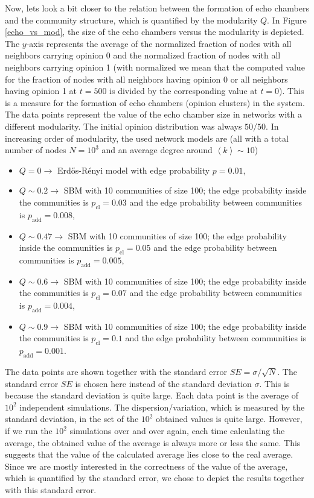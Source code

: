\documentclass[11 pt , letterpaper , twoside , openright]{book}
\begin{document}
Now, lets look a bit closer to the relation between the formation of echo chambers and the community structure, which is quantified by the modularity $Q$. In Figure \ref{echo_vs_mod}, the size of the echo chambers versus the modularity is depicted. The $y$-axis represents the average of the normalized fraction of nodes with all neighbors carrying opinion 0 and the normalized fraction of nodes with all neighbors carrying opinion 1 (with normalized we mean that the computed value for the fraction of nodes with all neighbors having opinion 0 or all neighbors having opinion 1 at $t=500$ is divided by the corresponding value at $t=0$). This is a measure for the formation of echo chambers (opinion clusters) in the system. The data points represent the value of the echo chamber size in networks with a different modularity. The initial opinion distribution was always $50/50$. 
\newpage
\noindent
In increasing order of modularity, the used network models are (all with a total number of nodes $N = 10^3$ and an average degree around $\left<k\right> \sim 10$)
\begin{itemize}
	\item $Q=0 \rightarrow$ Erd\H{o}s-R\'{e}nyi model with edge probability $p=0.01$,
	\item $Q \sim 0.2 \rightarrow$ SBM with 10 communities of size 100; the edge probability inside the communities is $p_{\text{cl}} = 0.03$ and the edge probability between communities is $p_{\text{add}} = 0.008$,
	\item $Q \sim 0.47 \rightarrow$ SBM with 10 communities of size 100; the edge probability inside the communities is $p_{\text{cl}} = 0.05$ and the edge probability between communities is $p_{\text{add}} = 0.005$,
	\item $Q \sim 0.6 \rightarrow$ SBM with 10 communities of size 100; the edge probability inside the communities is $p_{\text{cl}} = 0.07$ and the edge probability between communities is $p_{\text{add}} = 0.004$,
	\item $Q \sim 0.9 \rightarrow$ SBM with 10 communities of size 100; the edge probability inside the communities is $p_{\text{cl}} = 0.1$ and the edge probability between communities is $p_{\text{add}} = 0.001$.
\end{itemize}
The data points are shown together with the standard error $SE = \sigma /\sqrt{N}$. The standard error $SE$ is chosen here instead of the standard deviation $\sigma$. This is because the standard deviation is quite large. Each data point is the average of $10^2$ independent simulations. The dispersion/variation, which is measured by the standard deviation, in the set of the $10^2$ obtained values is quite large. However, if we run the $10^2$ simulations over and over again, each time calculating the average, the obtained value of the average is always more or less the same. This suggests that the value of the calculated average lies close to the real average. Since we are mostly interested in the correctness of the value of the average, which is quantified by the standard error, we chose to depict the results together with this standard error.\\
\end{document}
